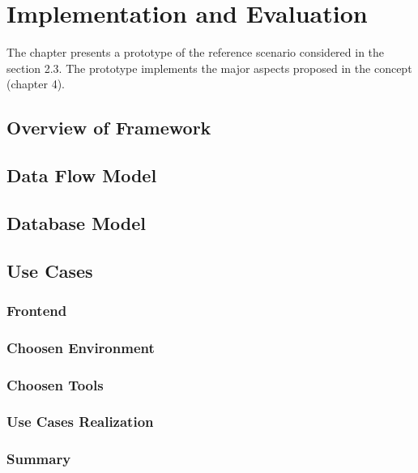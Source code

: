 \chapter{Implementation and Evaluation}
The chapter presents a prototype of the reference scenario considered in the section
2.3. The prototype implements the major aspects proposed in the concept (chapter
4).
\section{Overview of Framework}
\section{Data Flow Model}
\section{Database Model}
\section{Use Cases}
  \subsection{Frontend}
  \subsection{Choosen Environment}
  \subsection{Choosen Tools}
  \subsection{Use Cases Realization}
\subsection{Summary}